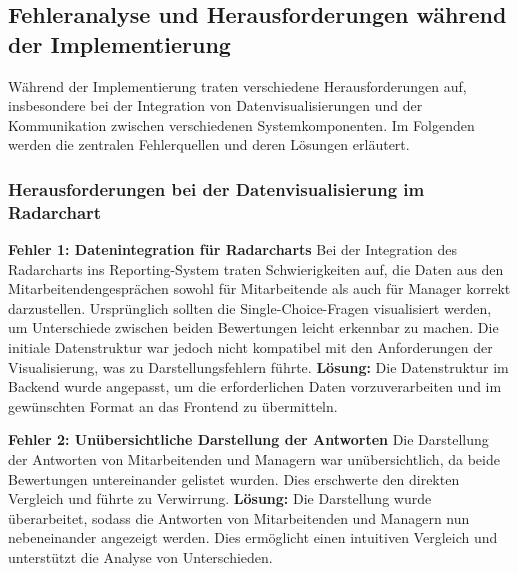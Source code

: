 \subsection{Fehleranalyse und Herausforderungen während der Implementierung}

Während der Implementierung traten verschiedene Herausforderungen auf, insbesondere bei der Integration von Datenvisualisierungen und der Kommunikation zwischen verschiedenen Systemkomponenten. Im Folgenden werden die zentralen Fehlerquellen und deren Lösungen erläutert.

\subsubsection*{Herausforderungen bei der Datenvisualisierung im Radarchart}

\textbf{Fehler 1: Datenintegration für Radarcharts}  
Bei der Integration des Radarcharts ins Reporting-System traten Schwierigkeiten auf, die Daten aus den Mitarbeitendengesprächen sowohl für Mitarbeitende als auch für Manager korrekt darzustellen. Ursprünglich sollten die Single-Choice-Fragen visualisiert werden, um Unterschiede zwischen beiden Bewertungen leicht erkennbar zu machen. Die initiale Datenstruktur war jedoch nicht kompatibel mit den Anforderungen der Visualisierung, was zu Darstellungsfehlern führte.  
\textbf{Lösung:} Die Datenstruktur im Backend wurde angepasst, um die erforderlichen Daten vorzuverarbeiten und im gewünschten Format an das Frontend zu übermitteln.

\textbf{Fehler 2: Unübersichtliche Darstellung der Antworten}  
Die Darstellung der Antworten von Mitarbeitenden und Managern war unübersichtlich, da beide Bewertungen untereinander gelistet wurden. Dies erschwerte den direkten Vergleich und führte zu Verwirrung.  
\textbf{Lösung:} Die Darstellung wurde überarbeitet, sodass die Antworten von Mitarbeitenden und Managern nun nebeneinander angezeigt werden. Dies ermöglicht einen intuitiven Vergleich und unterstützt die Analyse von Unterschieden.

